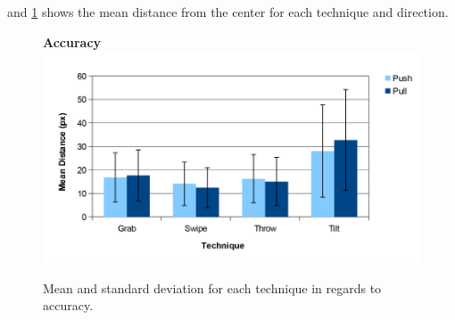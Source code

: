  and \cref{fig:accuracyGraph} shows the mean distance from the center for each technique and direction.
\begin{figure}[H]{
	\centering
	\textbf{Accuracy}\\[4pt]
	\includegraphics[width = 1\columnwidth ]{images/distance_graph.pdf}} 
	\caption{
		Mean and standard deviation for each technique in regards to accuracy.
	}
	\label{fig:accuracyGraph}
\end{figure}